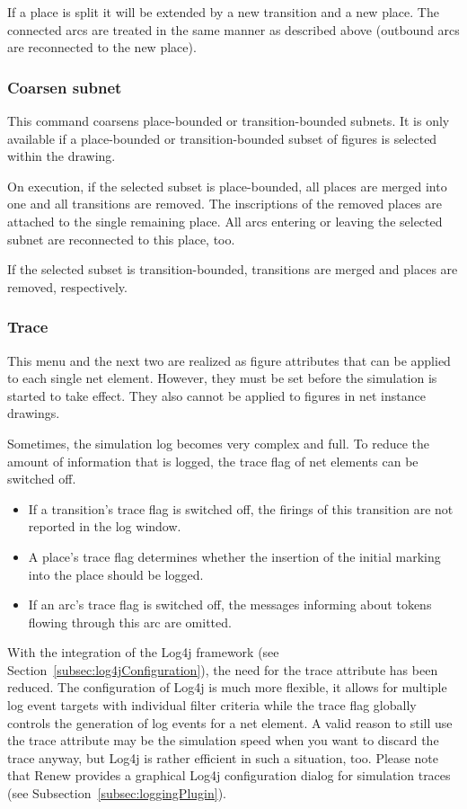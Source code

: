 If a place is split it will be extended by a new transition and
a new place. The connected arcs are treated in the same manner
as described above (outbound arcs are reconnected to the new
place).

\subsubsection{Coarsen subnet}
This command coarsens place-bounded or transition-bounded subnets.
It is only available if a place-bounded or transition-bounded
subset of figures is selected within the drawing.

On execution,
if the selected subset is place-bounded,
all places are merged into one and all transitions are removed.
The inscriptions of the removed places are attached to the single
remaining place.
All arcs entering or leaving the selected subnet are
reconnected to this place, too.

If the selected subset is transition-bounded, transitions are merged and
places are removed, respectively.



\subsubsection{Trace}
\label{subsubsec:trace}

This menu and the next two are realized as figure attributes
that can be applied to each single net element.
However, they must be set before the simulation is started to
take effect.
They also cannot be applied to figures in net instance drawings.

Sometimes, the simulation log becomes very complex and full.
To reduce the amount of information that is logged, the trace
flag of net elements can be switched off.
\begin{itemize}
\item If a transition's trace flag is switched off, the firings of this
      transition are not reported in the log window.
\item A place's trace flag determines whether the insertion of the initial
      marking into the place should be logged.
\item If an arc's trace flag is switched off, the messages informing about
      tokens flowing through this arc are omitted.
\end{itemize}

With the integration of the Log4j framework (see
Section~\ref{subsec:log4jConfiguration}), the need for the trace attribute has been
reduced.
The configuration of Log4j is much more flexible, it allows for multiple
log event targets with individual filter criteria while the trace flag
globally controls the generation of log events for a net element.
A valid reason to still use the trace attribute may be the simulation
speed when you want to discard the trace anyway, but Log4j is rather
efficient in such a situation, too.
Please note that Renew provides a graphical Log4j configuration dialog
for simulation traces (see Subsection~\ref{subsec:loggingPlugin}).%

